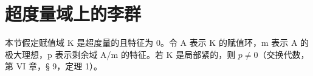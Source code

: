 \section{超度量域上的李群}

本节假定赋值域 K 是超度量的且特征为 0。令 A 表示 K 的赋值环，m 表示 A 的极大理想，p 表示剩余域 A/m 的特征。若 K 是局部紧的，则 \(p \neq 0\)（交换代数，第 VI 章，§ 9，定理 1）。

